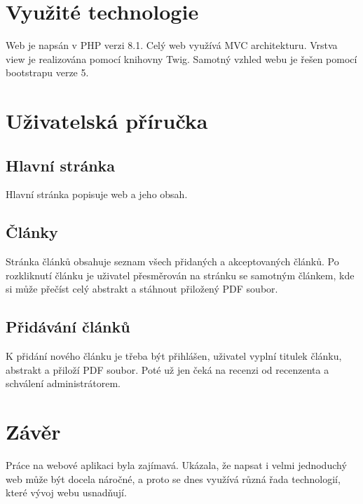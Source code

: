 \documentclass[
	12pt,
	a4paper,
	pdftex,
	czech,
	titlepage
]{report}
\begin{document}
\chapter{Využité technologie}
Web je napsán v PHP verzi 8.1. Celý web využívá MVC architekturu. Vrstva view
je
realizována pomocí knihovny Twig. Samotný vzhled webu je řešen pomocí
bootstrapu verze 5.

\chapter{Uživatelská příručka}

\section{Hlavní stránka}
Hlavní stránka popisuje web a jeho obsah.

\section{Články}
Stránka článků obsahuje seznam všech přidaných a akceptovaných článků. Po
rozkliknutí článku je uživatel přesměrován na stránku se samotným článkem, kde
si může přečíst celý abstrakt a stáhnout přiložený PDF soubor.

\section{Přidávání článků}
K přidání nového článku je třeba být přihlášen, uživatel vyplní titulek článku,
abstrakt a přiloží PDF soubor. Poté už jen čeká na recenzi od recenzenta a
schválení administrátorem.

\chapter{Závěr}
Práce na webové aplikaci byla zajímavá. Ukázala, že napsat i velmi jednoduchý
web může být docela náročné, a proto se dnes využívá různá řada technologií,
které vývoj webu usnadňují.
\end{document}
